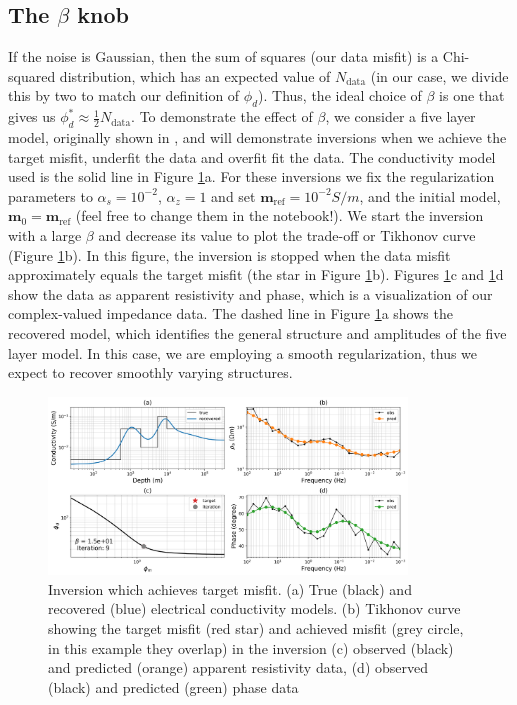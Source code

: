 \documentclass[11pt,oneside]{article}
\begin{document}
\subsection{The $\beta$ knob}

If the noise is Gaussian, then the sum of squares (our data misfit) is a Chi-squared distribution, which has an expected value of $N_\text{data}$ (in our case, we divide this by two to match our definition of $\phi_d$). Thus, the ideal choice of $\beta$ is one that gives us $\phi_d^* \approx \frac{1}{2} N_\text{data}$. To demonstrate the effect of $\beta$, we consider a five layer model, originally shown in \cite{Monographs}, and will demonstrate inversions when we achieve the target misfit, underfit the data and overfit fit the data. The conductivity model used is the solid line in Figure \ref{fig:justright}a. For these inversions we fix the regularization parameters to $\alpha_s = 10^{-2}$, $\alpha_z = 1$ and set $\mathbf{m}_{\text{ref}} = 10^{-2} S/m$, and the initial model, $\mathbf{m}_0 = \mathbf{m}_{\text{ref}}$ (feel free to change them in the notebook!). We start the inversion with a large $\beta$ and decrease its value to plot the trade-off or Tikhonov curve (Figure \ref{fig:justright}b). In this figure, the inversion is stopped when the data misfit approximately equals the  target misfit (the star in Figure \ref{fig:justright}b). Figures \ref{fig:justright}c and \ref{fig:justright}d show the data as apparent resistivity and phase, which is a visualization of our complex-valued impedance data. The dashed line in Figure \ref{fig:justright}a shows the recovered model, which identifies the general structure and amplitudes of the five layer model. In this case, we are employing a smooth regularization, thus we expect to recover smoothly varying structures.



\begin{figure}[htb!]
    \centering
    \includegraphics[width=0.85\textwidth]{images/justright.png}
\caption{Inversion which achieves target misfit. (a) True (black) and recovered (blue) electrical conductivity models. (b) Tikhonov curve showing the target misfit (red star) and achieved misfit (grey circle, in this example they overlap) in the inversion (c) observed (black) and predicted (orange) apparent resistivity data, (d) observed (black) and predicted (green) phase data}
\label{fig:justright}
\end{figure}
\end{document}
